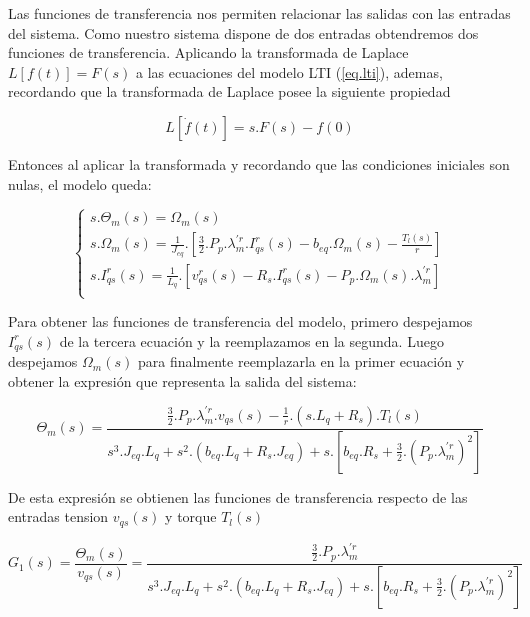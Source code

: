 \documentclass{article}
\begin{document}
Las funciones de transferencia nos permiten relacionar las salidas con las entradas del sistema.
Como nuestro sistema dispone de dos entradas obtendremos dos funciones de transferencia. Aplicando 
la transformada de Laplace $L[f(t)] = F(s)$ a las ecuaciones del modelo LTI (\ref{eq.lti}), ademas,
recordando que la transformada de Laplace posee la siguiente propiedad

\begin{equation}
        L[\dot{f}(t)] = s.F(s) - f(0)
\end{equation}

Entonces al aplicar la transformada y recordando que las condiciones iniciales son nulas, el 
modelo queda:

\begin{equation}
    \begin{cases}
        s.\Theta_{m}(s) = \Omega_{m}(s)\\
        s.\Omega_{m}(s) = \frac{1}{J_{eq}}.[\frac{3}{2}.P_{p}.\lambda_{m}^{\prime r}.I_{qs}^r(s) - b_{eq}.\Omega_m(s) - \frac{T_{l}(s)}{r}]\\
        s.I_{qs}^r(s) = \frac{1}{L_{q}}.[v_{qs}^r(s) - R_{s}.I_{qs}^r(s) - P_{p}.\Omega_{m}(s).\lambda_{m}^{\prime r}]\\
    \end{cases}
\end{equation}

Para obtener las funciones de transferencia del modelo, primero despejamos $I_{qs}^r(s)$
de la tercera ecuación y la reemplazamos en la segunda. Luego despejamos $\Omega_m(s)$ para 
finalmente reemplazarla en la primer ecuación y obtener la expresión que representa la salida del sistema: 

\begin{equation}
    \Theta_{m}(s) = \frac{\frac{3}{2}.P_{p}.\lambda_{m}^{\prime r}.v_{qs}(s) - \frac{1}{r}.(s.L_{q}+R_{s}).T_{l}(s)}{s^3.J_{eq}.L_{q} + s^2.(b_{eq}.L_{q} +  R_{s}.J_{eq}) + s.[b_{eq}.R_{s}+\frac{3}{2}.(P_{p}.\lambda_{m}^{\prime r})^2]}
\end{equation}

De esta expresión se obtienen las funciones de transferencia respecto de las entradas tension $v_{qs}(s)$ y torque $T_{l}(s)$

\begin{equation}\label{eq.trasnferencia_1}
    G_{1}(s) = \frac{\Theta_{m}(s)}{v_{qs}(s)} = \frac{\frac{3}{2}.P_{p}.\lambda_{m}^{\prime r}}{s^3.J_{eq}.L_{q} + s^2.(b_{eq}.L_{q} +  R_{s}.J_{eq}) + s.[b_{eq}.R_{s}+\frac{3}{2}.(P_{p}.\lambda_{m}^{\prime r})^2]}
\end{equation}
\end{document}
